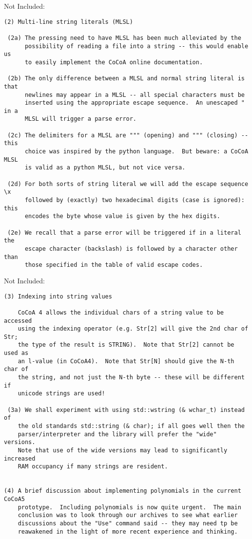 \documentclass{book}[12,a4paper]
\def\refandpage#1{{\ref{#1}, pg.\pageref{#1}}}
\begin{document}
Not Included: %
\begin{verbatim}
(2) Multi-line string literals (MLSL)

 (2a) The pressing need to have MLSL has been much alleviated by the
      possibility of reading a file into a string -- this would enable us
      to easily implement the CoCoA online documentation.

 (2b) The only difference between a MLSL and normal string literal is that
      newlines may appear in a MLSL -- all special characters must be
      inserted using the appropriate escape sequence.  An unescaped " in a
      MLSL will trigger a parse error.

 (2c) The delimiters for a MLSL are """ (opening) and """ (closing) -- this
      choice was inspired by the python language.  But beware: a CoCoA MLSL
      is valid as a python MLSL, but not vice versa.

 (2d) For both sorts of string literal we will add the escape sequence \x
      followed by (exactly) two hexadecimal digits (case is ignored): this
      encodes the byte whose value is given by the hex digits.

 (2e) We recall that a parse error will be triggered if in a literal the
      escape character (backslash) is followed by a character other than
      those specified in the table of valid escape codes.
\end{verbatim}

Not Included: %
\begin{verbatim}
(3) Indexing into string values

    CoCoA 4 allows the individual chars of a string value to be accessed
    using the indexing operator (e.g. Str[2] will give the 2nd char of Str;
    the type of the result is STRING).  Note that Str[2] cannot be used as
    an l-value (in CoCoA4).  Note that Str[N] should give the N-th char of
    the string, and not just the N-th byte -- these will be different if
    unicode strings are used!

 (3a) We shall experiment with using std::wstring (& wchar_t) instead of
    the old standards std::string (& char); if all goes well then the
    parser/interpreter and the library will prefer the "wide" versions.
    Note that use of the wide versions may lead to significantly increased
    RAM occupancy if many strings are resident.


(4) A brief discussion about implementing polynomials in the current CoCoA5
    prototype.  Including polynomials is now quite urgent.  The main
    conclusion was to look through our archives to see what earlier
    discussions about the "Use" command said -- they may need tp be
    reawakened in the light of more recent experience and thinking.
\end{verbatim}
\end{document}
